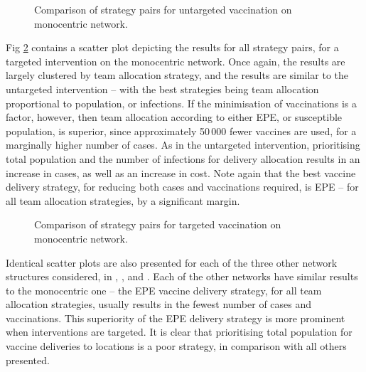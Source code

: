 \documentclass[10pt,letterpaper]{article}
\begin{document}
\begin{figure}[ht!]
\begin{center}
    \caption{Comparison of strategy pairs for untargeted vaccination on monocentric network.}
    \label{fig:strat_scatter_unt_mono}
\end{center}
\end{figure}

Fig \ref{fig:strat_scatter_tar_mono} contains a scatter plot depicting the results for all strategy pairs, for a targeted intervention on the monocentric network. Once again, the results are largely clustered by team allocation strategy, and the results are similar to the untargeted intervention -- with the best strategies being team allocation proportional to population, or infections. If the minimisation of vaccinations is a factor, however, then team allocation according to either EPE, or susceptible population, is superior, since approximately 50\,000 fewer vaccines are used, for a marginally higher number of cases. As in the untargeted intervention, prioritising total population and the number of infections for delivery allocation results in an increase in cases, as well as an increase in cost. Note again that the best vaccine delivery strategy, for reducing both cases and vaccinations required, is EPE -- for all team allocation strategies, by a significant margin. 

\begin{figure}[ht!]
\begin{center}
    \caption{Comparison of strategy pairs for targeted vaccination on monocentric network.} 
    \label{fig:strat_scatter_tar_mono}
\end{center}
\end{figure}

Identical scatter plots are also presented for each of the three other network structures considered, in , , and . Each of the other networks have similar results to the monocentric one -- the EPE vaccine delivery strategy, for all team allocation strategies, usually results in the fewest number of cases and vaccinations. This superiority of the EPE delivery strategy is more prominent when interventions are targeted. It is clear that prioritising total population for vaccine deliveries to locations is a poor strategy, in comparison with all others presented.
\end{document}
